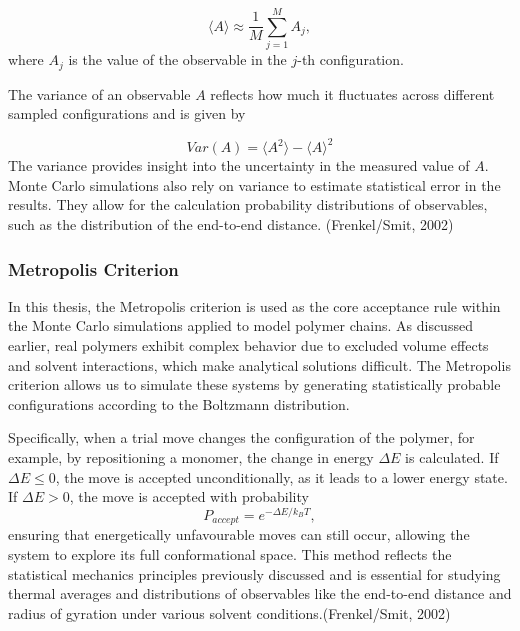 \documentclass{article}      %
\begin{document}
\[
\langle A \rangle \approx \frac{1}{M} \sum_{j=1}^M A_j,
\]
where \( A_j \) is the value of the observable in the \( j \)-th configuration.

The variance of an observable \( A \) reflects how much it fluctuates across different sampled configurations and is given by

\[
Var(A) = \langle A^2 \rangle - \langle A \rangle^2
\]
The variance provides insight into the uncertainty in the measured value of \( A \). Monte Carlo simulations also rely on variance to estimate statistical error in the results. They allow for the calculation probability distributions of observables, such as the distribution of the end-to-end distance. (Frenkel/Smit, 2002) 




\subsubsection{Metropolis Criterion}

In this thesis, the Metropolis criterion is used as the core acceptance rule within the Monte Carlo simulations applied to model polymer chains. As discussed earlier, real polymers exhibit complex behavior due to excluded volume effects and solvent interactions, which make analytical solutions difficult. The Metropolis criterion allows us to simulate these systems by generating statistically probable configurations according to the Boltzmann distribution.

Specifically, when a trial move changes the configuration of the polymer, for example, by repositioning a monomer, the change in energy \(\Delta E\) is calculated. If \(\Delta E \leq 0\), the move is accepted unconditionally, as it leads to a lower energy state. If \(\Delta E > 0\), the move is accepted with probability
\begin{equation}
P_{accept} = e^{-\Delta E / k_B T},
\end{equation}
ensuring that energetically unfavourable moves can still occur, allowing the system to explore its full conformational space. This method reflects the statistical mechanics principles previously discussed and is essential for studying thermal averages and distributions of observables like the end-to-end distance and radius of gyration under various solvent conditions.(Frenkel/Smit, 2002) 
\end{document}
